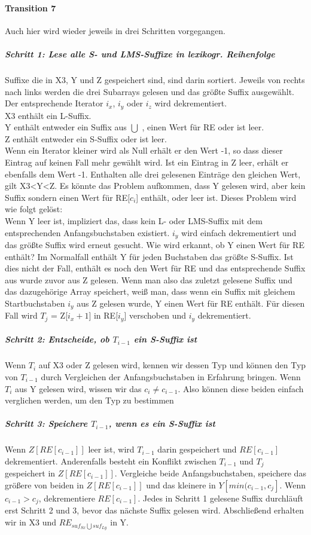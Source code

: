 \paragraph{Transition 7}
Auch hier wird wieder jeweils in drei Schritten vorgegangen.
\subparagraph{Schritt 1: Lese alle S- und LMS-Suffixe in lexikogr. Reihenfolge}
Suffixe die in X3, Y und Z gespeichert sind, sind darin sortiert. Jeweils von rechts nach links werden die drei Subarrays gelesen und das größte Suffix ausgewählt. Der entsprechende Iterator $i_{x}$, $i_{y}$ oder $i_{z}$ wird dekrementiert.\\
X3 enthält ein L-Suffix.\\
Y enthält entweder ein Suffix aus \sx $\bigcup$ \ly, einen Wert für RE oder ist leer.\\
Z enthält entweder ein S-Suffix oder ist leer.\\
Wenn ein Iterator kleiner wird als Null erhält er den Wert -1, so dass dieser Eintrag auf keinen Fall mehr gewählt wird. Ist ein Eintrag in Z leer, erhält er ebenfalls dem Wert -1. Enthalten alle drei gelesenen Einträge den gleichen Wert, gilt X3<Y<Z. Es könnte das Problem aufkommen, dass Y gelesen wird, aber kein Suffix sondern einen Wert für RE[$c_{i}$] enthält, oder leer ist. Dieses Problem wird wie folgt gelöst:\\
Wenn Y leer ist, impliziert das, dass kein L- oder LMS-Suffix mit dem entsprechenden Anfangsbuchstaben existiert. $i_{y}$ wird einfach dekrementiert und das größte Suffix wird erneut gesucht. Wie wird erkannt, ob Y einen Wert für RE enthält? Im Normalfall enthält Y für jeden Buchstaben das größte S-Suffix. Ist dies nicht der Fall, enthält es noch den Wert für RE und das entsprechende Suffix aus \sx wurde zuvor aus Z gelesen. Wenn man also das zuletzt gelesene Suffix und das dazugehörige Array speichert, weiß man, dass wenn ein Suffix mit gleichem Startbuchstaben $i_{y}$ aus Z gelesen wurde, Y einen Wert für RE enthält. Für diesen Fall wird $T_{j}$ = Z[$i_{x}+1$] in RE[$i_{y}$] verschoben und $i_{y}$ dekrementiert.
\subparagraph{Schritt 2: Entscheide, ob $T_{i-1}$ ein S-Suffix ist}
Wenn $T_{i}$ auf X3 oder Z gelesen wird, kennen wir dessen Typ und können den Typ von $T_{i-1}$ durch Vergleichen der Anfangsbuchstaben in Erfahrung bringen. Wenn $T_{i}$ aus Y gelesen wird, wissen wir das $c_{i}\neq c_{i-1}$. Also können diese beiden einfach verglichen werden, um den Typ zu bestimmen
\subparagraph{Schritt 3: Speichere $T_{i-1}$, wenn es ein S-Suffix ist}
Wenn $Z[RE[c_{i-1}]]$ leer ist, wird $T_{i-1}$ darin gespeichert und $RE[c_{i-1}]$ dekrementiert. Anderenfalls besteht ein Konflikt zwischen $T_{i-1}$ und $T_{j}$ gespeichert in $Z[RE[c_{i-1}]]$. Vergleiche beide Anfangsbuchstaben, speichere das größere von beiden in $Z[RE[c_{i-1}]]$ und das kleinere in $Y[min(c_{i-1},c_{j}]$. Wenn $c_{i-1}>c_{j}$, dekrementiere $RE[c_{i-1}]$.
\bigskip
Jedes in Schritt 1 gelesene Suffix durchläuft erst Schritt 2 und 3, bevor das nächste Suffix gelesen wird. Abschließend erhalten wir \SAsxnot in X3 und $RE_{suf_{Sx}\bigcup suf_{Ly}}$ in Y.
